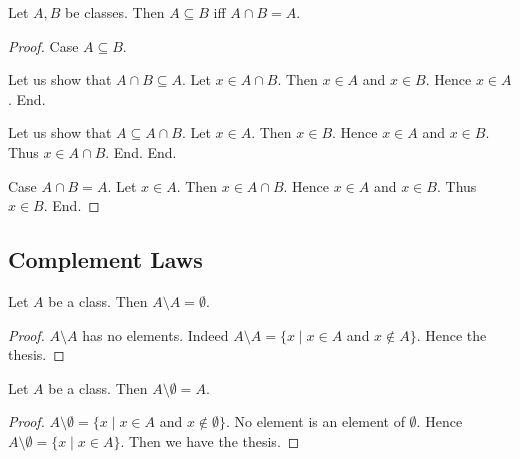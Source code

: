 \documentclass[10pt]{article}
\begin{document}
  \begin{forthel}
    \begin{proposition}[id=FOUNDATIONS_02_2356449346846720,printid]
      Let $A, B$ be classes.
      Then $A \subseteq B$ iff $A \cap B = A$.
    \end{proposition}
    \begin{proof}
      Case $A \subseteq B$.

        Let us show that $A \cap B \subseteq A$.
          Let $x \in A \cap B$.
          Then $x \in A$ and $x \in B$.
          Hence $x \in A$.
        End.

        Let us show that $A \subseteq A \cap B$.
          Let $x \in A$.
          Then $x \in B$.
          Hence $x \in A$ and $x \in B$.
          Thus $x \in A \cap B$.
        End.
      End.

      Case $A \cap B = A$.
        Let $x \in A$.
        Then $x \in A \cap B$.
        Hence $x \in A$ and $x \in B$.
        Thus $x \in B$.
      End.
    \end{proof}
  \end{forthel}


  \subsection*{Complement Laws}

  \begin{forthel}
    \begin{proposition}[id=FOUNDATIONS_02_7433299337150464,printid]
      Let $A$ be a class.
      Then $A \setminus A = \emptyset$.
    \end{proposition}
    \begin{proof}
      $A \setminus A$ has no elements.
      Indeed $A \setminus A = \{ x \mid x \in A$ and $x \notin A \}$.
      Hence the thesis.
    \end{proof}
  \end{forthel}

  \begin{forthel}
    \begin{proposition}[id=FOUNDATIONS_02_3783696985358336,printid]
      Let $A$ be a class.
      Then $A \setminus \emptyset = A$.
    \end{proposition}
    \begin{proof}
      $A \setminus \emptyset = \{ x \mid x \in A$ and $x \notin \emptyset \}$.
      No element is an element of $\emptyset$.
      Hence $A \setminus \emptyset = \{ x \mid x \in A \}$.
      Then we have the thesis.
    \end{proof}
  \end{forthel}
\end{document}
